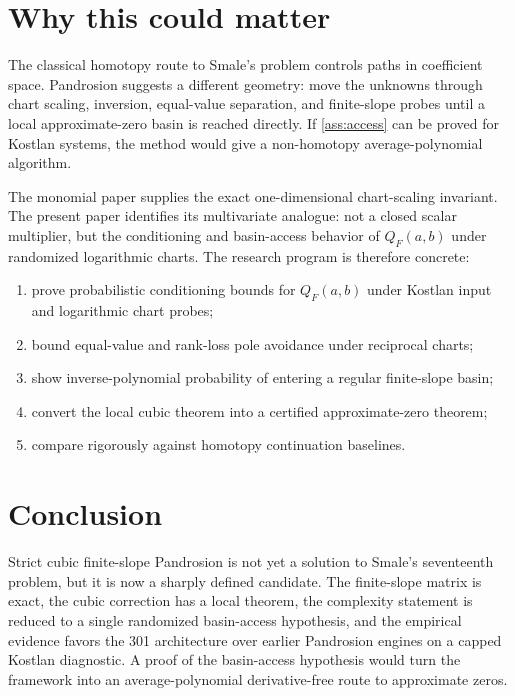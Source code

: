 \documentclass[11pt]{article}
\begin{document}
\section{Why this could matter}

The classical homotopy route to Smale's problem controls paths in coefficient space.  Pandrosion suggests a different geometry: move the unknowns through chart scaling, inversion, equal-value separation, and finite-slope probes until a local approximate-zero basin is reached directly.  If \cref{ass:access} can be proved for Kostlan systems, the method would give a non-homotopy average-polynomial algorithm.

The monomial paper supplies the exact one-dimensional chart-scaling invariant.  The present paper identifies its multivariate analogue: not a closed scalar multiplier, but the conditioning and basin-access behavior of $Q_F(a,b)$ under randomized logarithmic charts.  The research program is therefore concrete:
\begin{enumerate}[label=(\arabic*)]
\item prove probabilistic conditioning bounds for $Q_F(a,b)$ under Kostlan input and logarithmic chart probes;
\item bound equal-value and rank-loss pole avoidance under reciprocal charts;
\item show inverse-polynomial probability of entering a regular finite-slope basin;
\item convert the local cubic theorem into a certified approximate-zero theorem;
\item compare rigorously against homotopy continuation baselines.
\end{enumerate}

\section{Conclusion}

Strict cubic finite-slope Pandrosion is not yet a solution to Smale's seventeenth problem, but it is now a sharply defined candidate.  The finite-slope matrix is exact, the cubic correction has a local theorem, the complexity statement is reduced to a single randomized basin-access hypothesis, and the empirical evidence favors the 301 architecture over earlier Pandrosion engines on a capped Kostlan diagnostic.  A proof of the basin-access hypothesis would turn the framework into an average-polynomial derivative-free route to approximate zeros.
\end{document}
